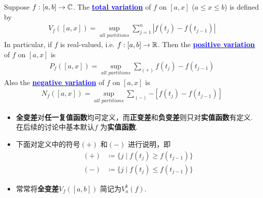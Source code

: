 	\begin{defn}\label{def 4.4.3}
		Suppose $f : [a , b] \rightarrow \mathbb{C}$. The \underline{\textcolor{blue}{\textbf{total variation}}} of $f$ on $[a , x]$ ($a \leq x \leq b$) is defined by
		\begin{align}
			V_{f}([a , x]) = \sup_{all \,\, partitions}{\sum_{j = 1}^{n}{\left| f(t_j) - f(t_{j - 1}) \right|}}
		\end{align}
		In particular, if $f$ is real-valued, i.e. $f : [a , b] \rightarrow \mathbb{R}$. Then the \underline{\textcolor{blue}{\textbf{positive variation}}} of $f$ on $[a , x]$ is
		\begin{align}
			P_{f}([a , x]) = \sup_{all \,\, partitions}{\sum_{(+)}{f(t_j) - f(t_{j - 1})}}
		\end{align}
		Also the \underline{\textcolor{blue}{\textbf{negative variation}}} of $f$ on $[a , x]$ is
		\begin{align}
			N_{f}([a , x]) = \sup_{all \,\, partitions}{\sum_{(-)}{- \left[ f(t_j) - f(t_{j - 1}) \right]}}
		\end{align}
	
		\vspace{1em}
		\begin{rmk}
			\begin{itemize}
				\item \textbf{全变差}对\textbf{任一复值函数}均可定义，而\textbf{正变差}和\textbf{负变差}则只对\textbf{实值函数}有定义. 在后续的讨论中基本默认$f$ 为\textbf{实值函数}.
				
				\vspace{1em}
				
				\item 下面对定义中的符号$(+)$ 和$(-)$ 进行说明，即
				\begin{align}
					(+) &\coloneqq \{ j \mid f(t_j) \geq f(t_{j - 1}) \} \\
					(-) &\coloneqq \{ j \mid f(t_j) \leq f(t_{j - 1}) \}
				\end{align}
			
				\vspace{1em}
				
				\item 常常将\textbf{全变差}$V_{f}([a , b])$ 简记为$V_{a}^{b}(f)$.
			\end{itemize}
		\end{rmk}
	\end{defn}

\newpage
